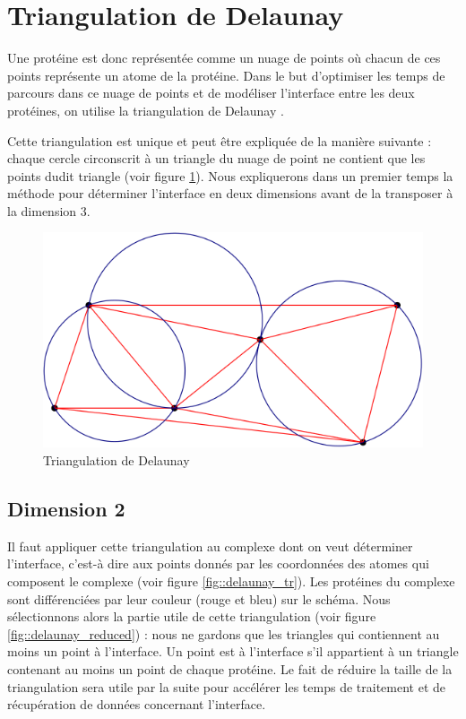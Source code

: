 \section{Triangulation de Delaunay}

Une protéine est donc représentée comme un nuage de points où chacun de ces points
représente un atome de la protéine. Dans le but d'optimiser les temps de parcours dans
ce nuage de points et de modéliser l'interface entre les deux protéines,
 on utilise la triangulation de Delaunay \cite{Triangulation}.

 Cette triangulation est unique et peut être expliquée de la manière suivante :
 chaque cercle circonscrit à un triangle du nuage de point ne contient que les points
 dudit triangle (voir figure \ref{fig::explication_delaunay}).
 Nous expliquerons dans un premier
 temps la méthode pour déterminer l'interface en deux dimensions avant de la transposer à la
 dimension 3.

\begin{figure}[ht]
\centering
  \includegraphics[width=\textwidth]{figures/explication_delaunay.png}
  \caption{Triangulation de Delaunay}
  \label{fig::explication_delaunay}
\end{figure}

\subsection*{Dimension 2}

Il faut appliquer cette triangulation au complexe dont on veut déterminer l'interface, c'est-à dire
aux points donnés par les coordonnées des atomes qui composent le complexe
(voir figure \ref{fig::delaunay_tr}). Les protéines du complexe sont différenciées
par leur couleur (rouge et bleu) sur le schéma. Nous sélectionnons alors la partie utile de
cette triangulation (voir figure \ref{fig::delaunay_reduced}) : nous ne gardons que
les triangles qui contiennent au moins un point à l'interface.
Un point est à l'interface s'il appartient à un triangle contenant au moins un point
de chaque protéine. Le fait de réduire la taille de la triangulation sera utile par la suite
pour accélérer les temps de traitement et de récupération de données concernant l'interface.




